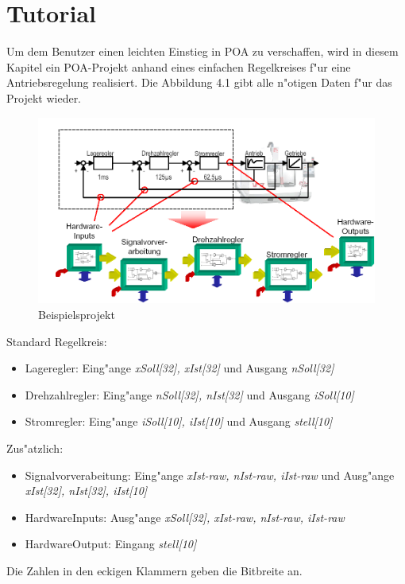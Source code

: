 
\chapter {Tutorial}
Um dem Benutzer einen leichten Einstieg in POA zu verschaffen, wird in diesem Kapitel ein POA-Projekt anhand eines einfachen Regelkreises f"ur eine Antriebsregelung realisiert. Die Abbildung 4.1 gibt alle n"otigen Daten f"ur das Projekt wieder.
\begin{figure}[htbp]

\begin{center}

\includegraphics[width=15cm]{Beispielsprojekt}
\caption{Beispielsprojekt}\label{test}
\end{center}

\end{figure}
\newline
Standard Regelkreis:
\begin{itemize}
	\item Lageregler: Eing"ange {\itshape xSoll[32], xIst[32]} und Ausgang {\itshape nSoll[32]}
	\item Drehzahlregler: Eing"ange {\itshape nSoll[32], nIst[32]} und Ausgang {\itshape iSoll[10]}
	\item Stromregler: Eing"ange {\itshape iSoll[10], iIst[10]} und Ausgang {\itshape stell[10]}
\end{itemize}

Zus"atzlich:
\begin{itemize}
	\item Signalvorverabeitung: Eing"ange {\itshape xIst-raw, nIst-raw, iIst-raw} und Ausg"ange {\itshape xIst[32], nIst[32], iIst[10]}
	\item HardwareInputs: Ausg"ange {\itshape xSoll[32], xIst-raw, nIst-raw, iIst-raw}
	\item HardwareOutput: Eingang {\itshape stell[10]}
\end{itemize}
Die Zahlen in den eckigen Klammern geben die Bitbreite an.
\par

